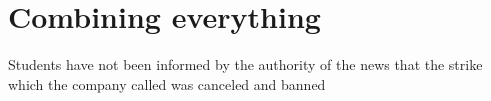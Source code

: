 \documentclass[letterpaper, 10pt]{article}
\begin{document}
\section{Combining everything}
\ex[exno = \textbf{Your turn}]Students have not been informed by the authority of the news that the strike which the company called was canceled and banned\xe
%
%
\end{document}
